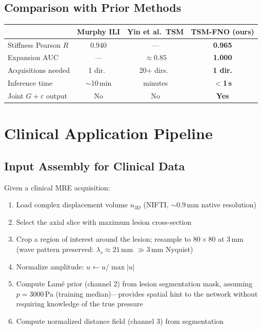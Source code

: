 \documentclass[11pt,letterpaper]{article}
\begin{document}
\subsection{Comparison with Prior Methods}

\begin{center}
\renewcommand{\arraystretch}{1.3}
\begin{tabular}{lccc}
\toprule
 & Murphy ILI & Yin et al.\ TSM & \textbf{TSM-FNO (ours)} \\
\midrule
Stiffness Pearson $R$ & 0.940 & --- & \textbf{0.965} \\
Expansion AUC & --- & $\approx 0.85$ & \textbf{1.000} \\
Acquisitions needed & 1 dir.\ & 20+ dirs.\ & \textbf{1 dir.} \\
Inference time & $\sim$10\,min & minutes & \textbf{$<$1\,s} \\
Joint $G + \varepsilon$ output & No & No & \textbf{Yes} \\
\bottomrule
\end{tabular}
\end{center}

\section{Clinical Application Pipeline}

\subsection{Input Assembly for Clinical Data}

Given a clinical MRE acquisition:
\begin{enumerate}[leftmargin=2em]
    \item Load complex displacement volume $u_{\mathrm{3D}}$ (NIFTI, $\sim$0.9\,mm
          native resolution)
    \item Select the axial slice with maximum lesion cross-section
    \item Crop a region of interest around the lesion; resample to $80\times80$ at 3\,mm
          (wave pattern preserved: $\lambda_s \approx 21$\,mm $\gg 3$\,mm Nyquist)
    \item Normalize amplitude: $u \leftarrow u / \max|u|$
    \item Compute Lam\'{e} prior (channel 2) from lesion segmentation mask,
          assuming $p = 3000$\,Pa (training median)---provides spatial hint to the
          network without requiring knowledge of the true pressure
    \item Compute normalized distance field (channel 3) from segmentation
\end{enumerate}
\end{document}
